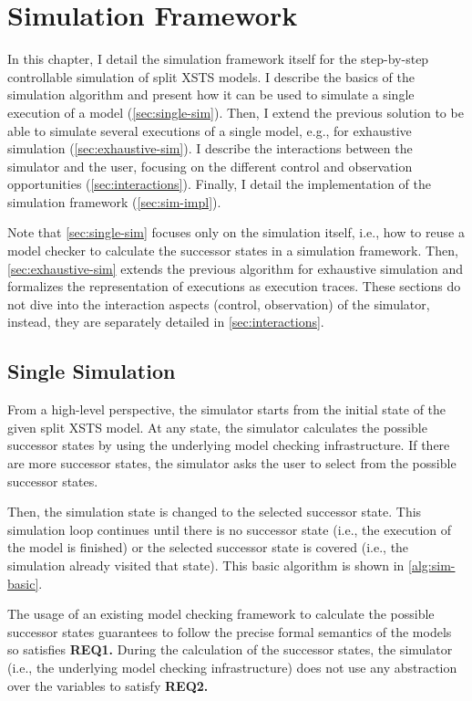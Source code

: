 \chapter{Simulation Framework} \label{ch:simulator}

In this chapter, I detail the simulation framework itself for the step-by-step controllable simulation of split XSTS models. I describe the basics of the simulation algorithm and present how it can be used to simulate a single execution of a model (\autoref{sec:single-sim}). Then, I extend the previous solution to be able to simulate several executions of a single model, e.g., for exhaustive simulation (\autoref{sec:exhaustive-sim}). I describe the interactions between the simulator and the user, focusing on the different control and observation opportunities (\autoref{sec:interactions}). Finally, I detail the implementation of the simulation framework (\autoref{sec:sim-impl}).

Note that \autoref{sec:single-sim} focuses only on the simulation itself, i.e., how to reuse a model checker to calculate the successor states in a simulation framework. Then, \autoref{sec:exhaustive-sim} extends the previous algorithm for exhaustive simulation and formalizes the representation of executions as execution traces. These sections do not dive into the interaction aspects (control, observation) of the simulator, instead, they are separately detailed in \autoref{sec:interactions}.

\section{Single Simulation}\label{sec:single-sim}

From a high-level perspective, the simulator starts from the initial state of the given split XSTS model. At any state, the simulator calculates the possible successor states by using the underlying model checking infrastructure. If there are more successor states, the simulator asks the user to select from the possible successor states.

Then, the simulation state is changed to the selected successor state. This simulation loop continues until there is no successor state (i.e., the execution of the model is finished) or the selected successor state is covered (i.e., the simulation already visited that state). This basic algorithm is shown in \autoref{alg:sim-basic}.

The usage of an existing model checking framework to calculate the possible successor states guarantees to follow the precise formal semantics of the models so satisfies \textbf{REQ1.} During the calculation of the successor states, the simulator (i.e., the underlying model checking infrastructure) does not use any abstraction over the variables to satisfy \textbf{REQ2.}

